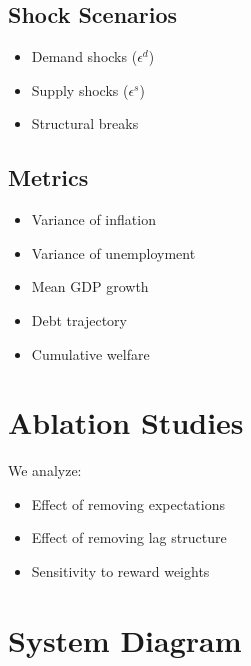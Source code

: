 \documentclass[11pt]{article}
\begin{document}
\subsection{Shock Scenarios}
\begin{itemize}
    \item Demand shocks ($\epsilon^d$)
    \item Supply shocks ($\epsilon^s$)
    \item Structural breaks
\end{itemize}

\subsection{Metrics}
\begin{itemize}
    \item Variance of inflation
    \item Variance of unemployment
    \item Mean GDP growth
    \item Debt trajectory
    \item Cumulative welfare
\end{itemize}

\section{Ablation Studies}
We analyze:
\begin{itemize}
    \item Effect of removing expectations
    \item Effect of removing lag structure
    \item Sensitivity to reward weights
\end{itemize}

\section{System Diagram}
\begin{center}
\end{center}
\end{document}
